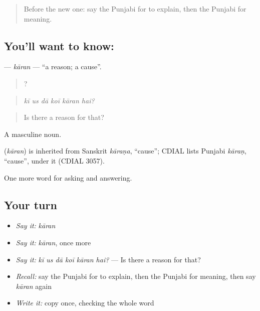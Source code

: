 \label{lesson:PA-C342-karan}



\begin{quote}
Before the new one: say the Punjabi for to explain, then the Punjabi for meaning.
\end{quote}

\subsection*{You'll want to know: }
\textbf{} — \emph{kāran} — \textquotedblleft{}a reason; a cause\textquotedblright{}.

\begin{quote}
     ?
\end{quote}

\begin{quote}
\emph{kī us dā koī kāran hai?}
\end{quote}

\begin{quote}
Is there a reason for that?
\end{quote}

A masculine noun.

\begin{cousinweb}
\textbf{} (\emph{kāran}) is inherited from Sanskrit \emph{kāraṇa}, \textquotedblleft{}cause\textquotedblright{}; CDIAL lists Punjabi \emph{kāraṇ}, \textquotedblleft{}cause\textquotedblright{}, under it (CDIAL 3057).
\end{cousinweb}

\begin{grammarlens}[title={What you've built}]
One more word for asking and answering.
\end{grammarlens}

\subsection*{Your turn}
\begin{itemize}
\raggedright
  \item \emph{Say it:} \emph{kāran}
  \item \emph{Say it:} \emph{kāran}, once more
  \item \emph{Say it:} \emph{kī us dā koī kāran hai?} — Is there a reason for that?
  \item \emph{Recall:} say the Punjabi for to explain, then the Punjabi for meaning, then say \emph{kāran} again
  \item \emph{Write it:} copy \textbf{} once, checking the whole word
\end{itemize}

